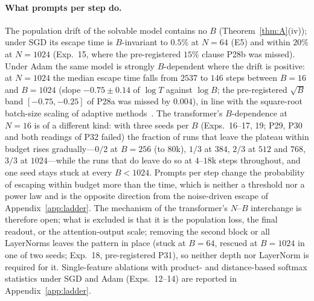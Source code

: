 \paragraph{What prompts per step do.}
The population drift of the solvable model contains no $B$ (Theorem~\ref{thm:A}(iv)); under SGD its escape time is $B$-invariant to $0.5\%$ at $N=64$ (E5)
and within $20\%$ at $N=1024$ (Exp.~15, where the pre-registered $15\%$ clause P28b was missed). Under Adam the same model is strongly $B$-dependent where
the drift is positive: at $N=1024$ the median escape time falls from $2537$ to $146$ steps between $B=16$ and $B=1024$ (slope $-0.75\pm0.14$ of $\log T$
against $\log B$; the pre-registered $\sqrt B$ band $[-0.75,-0.25]$ of P28a was missed by $0.004$), in line with the square-root batch-size scaling of
adaptive methods~\citep{malladi2022sdes}. The transformer's $B$-dependence at $N=16$ is of a different kind: with three seeds per $B$ (Exps.~16--17, 19; P29, P30 and both readings of P32 failed) the fraction of runs that leave the plateau within budget rises gradually---$0/2$ at $B=256$ (to $80$k), $1/3$ at $384$, $2/3$ at $512$ and $768$, $3/3$ at $1024$---while the runs that do leave do so at $4$--$18$k steps throughout, and one seed stays stuck at every $B<1024$. Prompts per step change the probability of escaping within budget more than the time, which is neither a threshold nor a power law and is the opposite direction from the noise-driven escape of Appendix~\ref{app:ladder}. The mechanism of the transformer's $N$--$B$ interchange is therefore open;
what is excluded is that it is the population loss, the final readout, or the attention-output scale; removing the second block or all LayerNorms leaves the pattern in place (stuck at $B=64$, rescued at $B=1024$ in one of two seeds; Exp.~18, pre-registered P31), so neither depth nor LayerNorm is required for it. Single-feature ablations with product- and
distance-based softmax statistics under SGD and Adam (Exps.~12--14) are reported in Appendix~\ref{app:ladder}.

